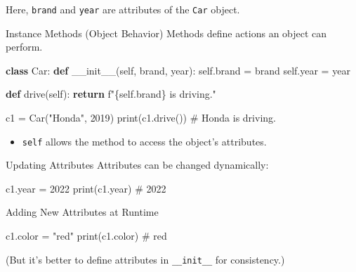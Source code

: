 \documentclass[
  letterpaper,
  DIV=11,
  numbers=noendperiod]{scrreprt}
\newenvironment{Shaded}{\begin{snugshade}}{\end{snugshade}}
\newcommand{\BuiltInTok}[1]{\textcolor[rgb]{0.00,0.23,0.31}{#1}}
\newcommand{\CommentTok}[1]{\textcolor[rgb]{0.37,0.37,0.37}{#1}}
\newcommand{\ControlFlowTok}[1]{\textcolor[rgb]{0.00,0.23,0.31}{\textbf{#1}}}
\newcommand{\DecValTok}[1]{\textcolor[rgb]{0.68,0.00,0.00}{#1}}
\newcommand{\FunctionTok}[1]{\textcolor[rgb]{0.28,0.35,0.67}{#1}}
\newcommand{\KeywordTok}[1]{\textcolor[rgb]{0.00,0.23,0.31}{\textbf{#1}}}
\newcommand{\NormalTok}[1]{\textcolor[rgb]{0.00,0.23,0.31}{#1}}
\newcommand{\OperatorTok}[1]{\textcolor[rgb]{0.37,0.37,0.37}{#1}}
\newcommand{\SpecialCharTok}[1]{\textcolor[rgb]{0.37,0.37,0.37}{#1}}
\newcommand{\SpecialStringTok}[1]{\textcolor[rgb]{0.13,0.47,0.30}{#1}}
\newcommand{\StringTok}[1]{\textcolor[rgb]{0.13,0.47,0.30}{#1}}
\newcommand{\VariableTok}[1]{\textcolor[rgb]{0.07,0.07,0.07}{#1}}
\providecommand{\tightlist}{%
  \setlength{\itemsep}{0pt}\setlength{\parskip}{0pt}}
\begin{document}
Here, \texttt{brand} and \texttt{year} are attributes of the
\texttt{Car} object.

Instance Methods (Object Behavior) Methods define actions an object can
perform.

\begin{Shaded}
\begin{Highlighting}[]
\KeywordTok{class}\NormalTok{ Car:}
    \KeywordTok{def} \FunctionTok{\_\_init\_\_}\NormalTok{(}\VariableTok{self}\NormalTok{, brand, year):}
        \VariableTok{self}\NormalTok{.brand }\OperatorTok{=}\NormalTok{ brand}
        \VariableTok{self}\NormalTok{.year }\OperatorTok{=}\NormalTok{ year}
    
    \KeywordTok{def}\NormalTok{ drive(}\VariableTok{self}\NormalTok{):}
        \ControlFlowTok{return} \SpecialStringTok{f"}\SpecialCharTok{\{}\VariableTok{self}\SpecialCharTok{.}\NormalTok{brand}\SpecialCharTok{\}}\SpecialStringTok{ is driving."}

\NormalTok{c1 }\OperatorTok{=}\NormalTok{ Car(}\StringTok{"Honda"}\NormalTok{, }\DecValTok{2019}\NormalTok{)}
\BuiltInTok{print}\NormalTok{(c1.drive())   }\CommentTok{\# Honda is driving.}
\end{Highlighting}
\end{Shaded}

\begin{itemize}
\tightlist
\item
  \texttt{self} allows the method to access the object's attributes.
\end{itemize}

Updating Attributes Attributes can be changed dynamically:

\begin{Shaded}
\begin{Highlighting}[]
\NormalTok{c1.year }\OperatorTok{=} \DecValTok{2022}
\BuiltInTok{print}\NormalTok{(c1.year)   }\CommentTok{\# 2022}
\end{Highlighting}
\end{Shaded}

Adding New Attributes at Runtime

\begin{Shaded}
\begin{Highlighting}[]
\NormalTok{c1.color }\OperatorTok{=} \StringTok{"red"}
\BuiltInTok{print}\NormalTok{(c1.color)   }\CommentTok{\# red}
\end{Highlighting}
\end{Shaded}

(But it's better to define attributes in \texttt{\_\_init\_\_} for
consistency.)
\end{document}
